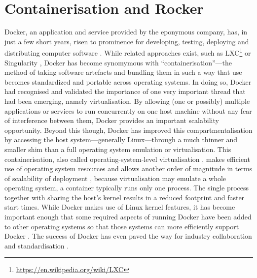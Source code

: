 \hypertarget{containerisation-and-rocker}{%
\section{Containerisation and
Rocker}\label{containerisation-and-rocker}}

\label{containerisation} \label{rocker}

Docker, an application and service provided by the eponymous company,
has, in just a few short years, risen to prominence for developing,
testing, deploying and distributing computer software
\citep[cf.][]{datadog_8_2018,munoz_history_2019}. While related
approaches exist, such as
LXC\footnote{\href{https://en.wikipedia.org/wiki/LXC}{https://en.wikipedia.org/wiki/LXC}}
or Singularity \citep{kurtzer_singularity_2017}, Docker has become
synomymous with ``containerisation''---the method of taking software
artefacts and bundling them in such a way that use becomes standardized
and portable across operating systems. In doing so, Docker had
recognised and validated the importance of one very important thread
that had been emerging, namely virtualisation. By allowing (one or
possibly) multiple applications or services to run concurrently on one
host machine without any fear of interference between them, Docker
provides an important scalability opportunity. Beyond this though,
Docker has improved this compartmentalisation by accessing the host
system---generally Linux---through a much thinner and smaller shim than
a full operating system emulation or virtualisation. This
containerisation, also called operating-system-level virtualisation
\citep{wikipedia_contributors_os-level_2020}, makes efficient use of
operating system resources \citep{felter_updated_2015} and allows
another order of magnitude in terms of scalability of deployment
\citep[cf.][]{datadog_8_2018}, because virtualisation may emulate a
whole operating system, a container typically runs only one process. The
single process together with sharing the host's kernel results in a
reduced footprint and faster start times. While Docker makes use of
Linux kernel features, it has become important enough that some required
aspects of running Docker have been added to other operating systems so
that those systems can more efficiently support Docker
\citep{microsoft_linux_2019}. The success of Docker has even paved the
way for industry collaboration and standardisation
\citep{oci_open_2019}.


